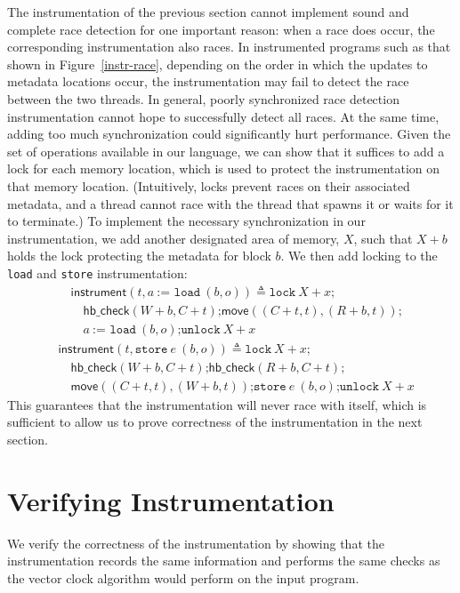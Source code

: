 \documentclass[preprint, 10pt]{sigplanconf}
\newcommand{\load}[2]{#1\ \texttt{:= load}\ #2}
\newcommand{\store}[2]{\texttt{store}\ #2\ #1}
\newcommand{\lock}[1]{\texttt{lock}\ #1}
\newcommand{\unlock}[1]{\texttt{unlock}\ #1}
\newcommand{\move}[2]{\ensuremath{\mathsf{move}(#1, #2)}}
\newcommand{\vcle}[2]{\ensuremath{\mathsf{hb\_check}(#1, #2)}}
\newcommand{\instr}[2]{\ensuremath{\mathsf{instrument}(#1, #2)}}
\begin{document}
The instrumentation of the previous section cannot implement sound and complete race detection for one important reason: when a race does occur, the corresponding instrumentation also races. In instrumented programs such as that shown in Figure~\ref{instr-race}, depending on the order in which the updates to metadata locations occur, the instrumentation may fail to detect the race between the two threads. In general, poorly synchronized race detection instrumentation cannot hope to successfully detect all races. At the same time, adding too much synchronization could significantly hurt performance. Given the set of operations available in our language, we can show that it suffices to add a lock for each memory location, which is used to protect the instrumentation on that memory location. (Intuitively, locks prevent races on their associated metadata, and a thread cannot race with the thread that spawns it or waits for it to terminate.) To implement the necessary synchronization in our instrumentation, we add another designated area of memory, $X$, such that $X + b$ holds the lock protecting the metadata for block $b$. We then add locking to the \texttt{load} and \texttt{store} instrumentation:
\begin{align*}&\instr{t}{\load{a}{(b, o)}} \triangleq \lock{X + x}\texttt{;} \\&\quad\vcle{W + b}{C + t}\texttt{;} \move{(C + t, t)}{(R + b, t)}\texttt{;} \\&\quad\load{a}{(b, o)}\texttt{;} \unlock{X + x}\end{align*}
\begin{align*}&\instr{t}{\store{(b, o)}{e}} \triangleq \lock{X + x}\texttt{;} \\&\quad\vcle{W + b}{C + t}\texttt{;} \vcle{R + b}{C + t}\texttt{;} \\&\quad\move{(C + t, t)}{(W + b, t)}\texttt{;} \store{(b, o)}{e}\texttt{;} \unlock{X + x}\end{align*}
This guarantees that the instrumentation will never race with itself, which is sufficient to allow us to prove correctness of the instrumentation in the next section.

\section{Verifying Instrumentation}
\label{verification}
We verify the correctness of the instrumentation by showing that the instrumentation records the same information and performs the same checks as the vector clock algorithm would perform on the input program.
\end{document}
